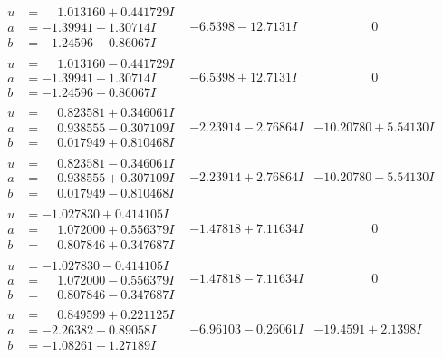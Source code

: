 \documentclass[1p]{elsarticle_modified}
\theoremstyle{definition}
\begin{document}
$$\begin{array}{c|c|c}
\begin{aligned}
u &= \phantom{-}1.013160 + 0.441729 I \\
a &= -1.39941 + 1.30714 I \\
b &= -1.24596 + 0.86067 I\end{aligned}
 & -6.5398 - 12.7131 I & \phantom{-0.000000 } 0 \\ \hline\begin{aligned}
u &= \phantom{-}1.013160 - 0.441729 I \\
a &= -1.39941 - 1.30714 I \\
b &= -1.24596 - 0.86067 I\end{aligned}
 & -6.5398 + 12.7131 I & \phantom{-0.000000 } 0 \\ \hline\begin{aligned}
u &= \phantom{-}0.823581 + 0.346061 I \\
a &= \phantom{-}0.938555 - 0.307109 I \\
b &= \phantom{-}0.017949 + 0.810468 I\end{aligned}
 & -2.23914 - 2.76864 I & -10.20780 + 5.54130 I \\ \hline\begin{aligned}
u &= \phantom{-}0.823581 - 0.346061 I \\
a &= \phantom{-}0.938555 + 0.307109 I \\
b &= \phantom{-}0.017949 - 0.810468 I\end{aligned}
 & -2.23914 + 2.76864 I & -10.20780 - 5.54130 I \\ \hline\begin{aligned}
u &= -1.027830 + 0.414105 I \\
a &= \phantom{-}1.072000 + 0.556379 I \\
b &= \phantom{-}0.807846 + 0.347687 I\end{aligned}
 & -1.47818 + 7.11634 I & \phantom{-0.000000 } 0 \\ \hline\begin{aligned}
u &= -1.027830 - 0.414105 I \\
a &= \phantom{-}1.072000 - 0.556379 I \\
b &= \phantom{-}0.807846 - 0.347687 I\end{aligned}
 & -1.47818 - 7.11634 I & \phantom{-0.000000 } 0 \\ \hline\begin{aligned}
u &= \phantom{-}0.849599 + 0.221125 I \\
a &= -2.26382 + 0.89058 I \\
b &= -1.08261 + 1.27189 I\end{aligned}
 & -6.96103 - 0.26061 I & -19.4591 + 2.1398 I \\ \hline\begin{aligned}

\end{aligned}
\end{array}$$
\end{document}

